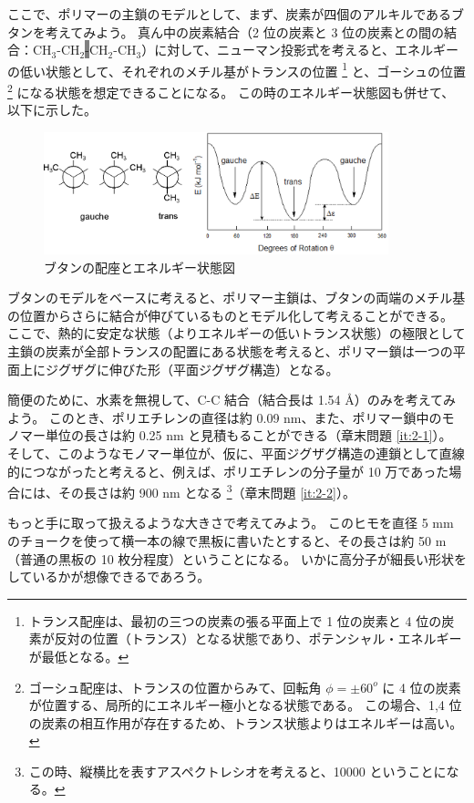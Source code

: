 \documentclass[11pt]{jsarticle}
\begin{document}
ここで、ポリマーの主鎖のモデルとして、まず、炭素が四個のアルキルであるブタンを考えてみよう。
真ん中の炭素結合（2 位の炭素と 3 位の炭素との間の結合：CH$_3$-CH$_2$\colorbox{gray}{-}CH$_2$-CH$_3$）に対して、ニューマン投影式を考えると、エネルギーの低い状態として、それぞれのメチル基がトランスの位置
\footnote
{
トランス配座は、最初の三つの炭素の張る平面上で 1 位の炭素と 4 位の炭素が反対の位置（トランス）となる状態であり、ポテンシャル・エネルギーが最低となる。
}
と、ゴーシュの位置
\footnote
{
ゴーシュ配座は、トランスの位置からみて、回転角 $\phi = \pm 60^o$ に 4 位の炭素が位置する、局所的にエネルギー極小となる状態である。
この場合、1,4 位の炭素の相互作用が存在するため、トランス状態よりはエネルギーは高い。
}
になる状態を想定できることになる。
この時のエネルギー状態図も併せて、以下に示した。
\begin{figure}[htb]
 \centering
	\includegraphics[width=10cm]{figure/butane.eps}
	\caption{ブタンの配座とエネルギー状態図}
	\label{fig: butane}
\end{figure}

ブタンのモデルをベースに考えると、ポリマー主鎖は、ブタンの両端のメチル基の位置からさらに結合が伸びているものとモデル化して考えることができる。
ここで、熱的に安定な状態（よりエネルギーの低いトランス状態）の極限として主鎖の炭素が全部トランスの配置にある状態を考えると、ポリマー鎖は一つの平面上にジグザグに伸びた形（平面ジグザグ構造）となる。

簡便のために、水素を無視して、C-C 結合（結合長は 1.54 \AA）のみを考えてみよう。
このとき、ポリエチレンの直径は約 0.09 nm、また、ポリマー鎖中のモノマー単位の長さは約 0.25 nm と見積もることができる（章末問題 \ref{it:2-1}）。
そして、このようなモノマー単位が、仮に、平面ジグザグ構造の連鎖として直線的につながったと考えると、例えば、ポリエチレンの分子量が 10 万であった場合には、その長さは約 900 nm となる
\footnote
{
この時、縦横比を表すアスペクトレシオを考えると、10000 ということになる。
}（章末問題 \ref{it:2-2}）。

もっと手に取って扱えるような大きさで考えてみよう。
このヒモを直径 5 mm のチョークを使って横一本の線で黒板に書いたとすると、その長さは約 50 m （普通の黒板の 10 枚分程度）ということになる。
いかに高分子が細長い形状をしているかが想像できるであろう。
 
\end{document}
